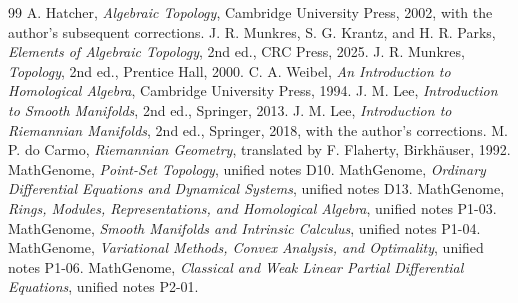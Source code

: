 \documentclass[11pt,oneside,openany]{book}
\theoremstyle{plain}
\theoremstyle{definition}
\theoremstyle{remark}
\begin{document}
\backmatter
\begingroup
\small
\begin{thebibliography}{99}
 A. Hatcher, \emph{Algebraic Topology}, Cambridge
University Press, 2002, with the author's subsequent corrections.
 J. R. Munkres, S. G. Krantz, and H. R. Parks,
\emph{Elements of Algebraic Topology}, 2nd ed., CRC Press, 2025.
 J. R. Munkres, \emph{Topology}, 2nd ed.,
Prentice Hall, 2000.
 C. A. Weibel, \emph{An Introduction to Homological
Algebra}, Cambridge University Press, 1994.
 J. M. Lee, \emph{Introduction to Smooth Manifolds},
2nd ed., Springer, 2013.
 J. M. Lee, \emph{Introduction to Riemannian Manifolds},
2nd ed., Springer, 2018, with the author's corrections.
 M. P. do Carmo, \emph{Riemannian Geometry}, translated
by F. Flaherty, Birkh\"auser, 1992.
 MathGenome, \emph{Point-Set Topology}, unified notes D10.
 MathGenome, \emph{Ordinary Differential Equations and
Dynamical Systems}, unified notes D13.
 MathGenome, \emph{Rings, Modules, Representations, and
Homological Algebra}, unified notes P1-03.
 MathGenome, \emph{Smooth Manifolds and Intrinsic
Calculus}, unified notes P1-04.
 MathGenome, \emph{Variational Methods, Convex Analysis,
and Optimality}, unified notes P1-06.
 MathGenome, \emph{Classical and Weak Linear Partial
Differential Equations}, unified notes P2-01.
\end{thebibliography}
\endgroup
\end{document}
